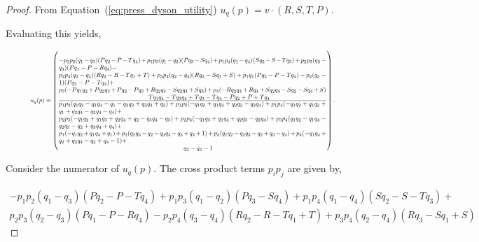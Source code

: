 \begin{proof}

From Equation~(\ref{eq:press_dyson_utility}) \(u_q(p) = v \cdot (R, S, T, P)\).

Evaluating this yields,

\begingroup
\scriptsize
\begin{equation*}
    \resizebox{0.91\hsize}{!}{
    $u_q(p) = \left(
    \frac
        {\parbox{6in}{$ - p_{1} p_{2} (q_{1} - q_{3}) (P q_{2} - P - T q_{4}) + p_{1} p_{3} (q_{1} - q_{2}) (P q_{3} - S q_{4}) + p_{1} p_{4} (q_{1} - q_{4}) (S q_{2} - S - T q_{3}) + p_{2} p_{3} (q_{2} - q_{3}) (P q_{1} - P - R q_{4}) - $ \\
        $ p_{2} p_{4} (q_{3} - q_{4}) (R q_{2} - R - T q_{1} + T) + p_{3} p_{4} (q_{2} - q_{4}) (R q_{3} - S q_{1} + S) + p_{1} q_{1} (P q_{2} - P - T q_{4}) - p_{2} (q_{3} - 1) (P q_{2} - P - T q_{4}) + $ \\
        $ p_{3} (- P q_{1} q_{2} + P q_{2} q_{3} + P q_{2} - P q_{3} + R q_{2} q_{4} - S q_{2} q_{4} + S q_{4}) + p_{4} (- R q_{2} q_{4} + R q_{4} + S q_{2} q_{4} - S q_{2} - S q_{4} + S ) $ \\
        \hspace*{5cm} $ T q_{1} q_{4} - T q_{3} q_{4} + T q_{3} - T q_{4} - P q_{2} + P + T q_{4}$
        }}
        {\parbox{6in}{$
        p_{1} p_{2} (q_{1} q_{2} - q_{1} q_{4} - q_{1} - q_{2} q_{3} + q_{3} q_{4} + q_{3}) + p_{1} p_{3} (- q_{1} q_{3} + q_{1} q_{4} + q_{2} q_{3} - q_{2} q_{4}) + p_{1} p_{4} (- q_{1} q_{2} + q_{1} q_{3} + q_{1} + q_{2} q_{4} - q_{3} q_{4} - q_{4}) +$ \\
        $ p_{2} p_{3} (- q_{1} q_{2} + q_{1} q_{3} + q_{2} q_{4} + q_{2} - q_{3} q_{4} - q_{3}) + p_{2} p_{4} (- q_{1} q_{3} + q_{1} q_{4} + q_{2} q_{3} - q_{2} q_{4}) + p_{3} p_{4} (q_{1} q_{2} - q_{1} q_{4} - q_{2} q_{3} - q_{2} + q_{3} q_{4} + q_{4}) + $ \\
        $ p_{1} (- q_{1} q_{2} + q_{1} q_{4} + q_{1}) + p_{2} (q_{2} q_{3} - q_{2} - q_{3} q_{4} - q_{3} + q_{4} + 1) + p_{3} (q_{1} q_{2} - q_{2} q_{3} - q_{2} + q_{3} - q_{4}) + p_{4} (- q_{1} q_{4} + q_{2} + q_{3} q_{4} - q_{3} + q_{4} - 1) + $ \\
        \hspace*{7cm} $q_{2} - q_{4} - 1$
    }}
    \right).$}
\end{equation*}
    \endgroup

Consider the numerator of \(u_q(p)\). The cross product terms \(p_ip_j\) are
given by,

\begingroup
\footnotesize
\begin{align*}
- p_{1} p_{2} (q_{1} - q_{3}) (P q_{2} - P - T q_{4}) + p_{1} p_{3} (q_{1} - q_{2}) (P q_{3} - S q_{4}) + p_{1} p_{4} (q_{1} - q_{4}) (S q_{2} - S - T q_{3}) + \\
p_{2} p_{3} (q_{2} - q_{3}) (P q_{1} - P - R q_{4}) - p_{2} p_{4} (q_{3} - q_{4}) (R q_{2} - R - T q_{1} + T) + p_{3} p_{4} (q_{2} - q_{4}) (R q_{3} - S q_{1} + S)
\end{align*}
\endgroup


\end{proof}
